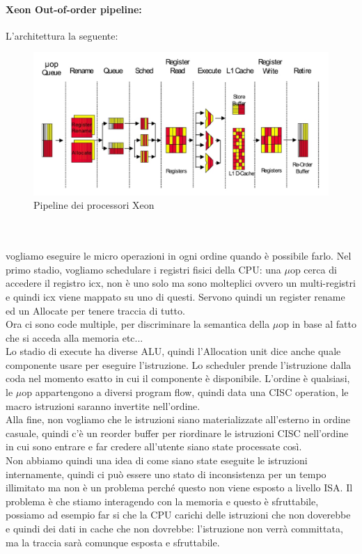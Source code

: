 \documentclass[12pt, oneside]{extbook} %
\begin{document}
\paragraph{Xeon Out-of-order pipeline:}
L'architettura  la seguente:\\
\begin{figure}[!h]
	\includegraphics[scale=0.5]{immagini/xeon_ooo.png}
	\caption{Pipeline dei processori Xeon}
\end{figure}\\\\
vogliamo eseguire le micro operazioni in ogni ordine quando è possibile farlo. Nel primo stadio, vogliamo schedulare i registri fisici della CPU: una $\mu$op cerca di accedere il registro icx, non è uno solo ma sono molteplici ovvero un multi-registri e quindi icx viene mappato su uno di questi. Servono quindi un register rename ed un Allocate per tenere traccia di tutto.\\ Ora ci sono code multiple, per discriminare la semantica della $\mu$op in base al fatto che si acceda alla memoria etc...\\ Lo stadio di execute ha diverse ALU, quindi l'Allocation unit dice anche quale componente usare per eseguire l'istruzione. Lo scheduler prende l'istruzione dalla coda nel momento esatto in cui il componente è disponibile. L'ordine è qualsiasi, le $\mu$op appartengono a diversi program flow, quindi data una CISC operation, le macro istruzioni saranno invertite nell'ordine. \\ Alla fine, non vogliamo che le istruzioni siano materializzate all'esterno in ordine casuale, quindi c'è un reorder buffer per riordinare le istruzioni CISC nell'ordine in cui sono entrare e far credere all'utente siano state processate così.\\ Non abbiamo quindi una idea di come siano state eseguite le istruzioni internamente, quindi ci può essere uno stato di inconsistenza per un tempo illimitato ma non è un problema perché questo non viene esposto a livello ISA. Il problema è che stiamo interagendo con la memoria e questo è sfruttabile, possiamo ad esempio far si che la CPU carichi delle istruzioni che non doverebbe e quindi dei dati in cache che non dovrebbe: l'istruzione non verrà committata, ma la traccia sarà comunque esposta e sfruttabile.
\end{document}
